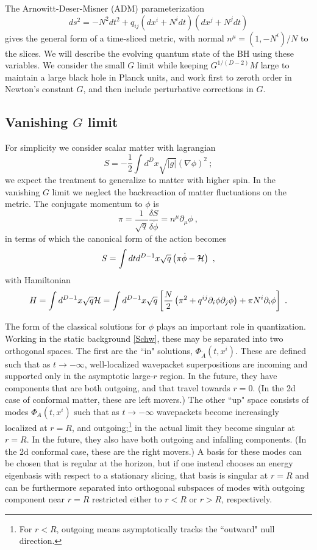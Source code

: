 \documentclass[12pt]{article}
\numberwithin{equation}{section}
\newcommand{\calh}{{\cal H}}
\newcommand{\beq}{\begin{equation}}
\newcommand{\eeq}{\end{equation}}
\newcommand{\hf}{\frac{1}{2}}
\begin{document}
The Arnowitt-Deser-Misner (ADM) parameterization\cite{ADM}
\beq
ds^2= -N^2 dt^2 + q_{ij}(dx^i + N^i dt)(dx^j + N^j dt)
\eeq
gives the general form of a time-sliced metric, with normal $n^\mu=(1,-N^i)/N$ to the slices.  We will describe the evolving quantum state of the BH using these variables.  We consider  the small $G$ limit while keeping $G^{1/(D-2)}M$ large to maintain a large black hole in Planck units,
and work first to zeroth order in Newton's constant $G$, and then include perturbative corrections in $G$.


\subsection{Vanishing $G$ limit}
\label{Gez}

 For simplicity we consider scalar matter with lagrangian
\beq
S=-\hf \int d^D x \sqrt{|g|} (\nabla\phi)^2 \ ;
\eeq
we expect the treatment to generalize to matter with higher spin.  In the vanishing $G$ limit we neglect the backreaction of matter fluctuations on the metric.  The conjugate momentum to $\phi$ is 
\beq
\pi= \frac{1}{\sqrt q}\frac{\delta S}{\delta \dot\phi} =  n^\mu\partial_\mu \phi\ ,
\eeq
in terms of which the canonical form of the action becomes
\beq
S=\int dt d^{D-1}x \sqrt q \left(\pi \dot\phi  - \calh\right)\ ,
\eeq
with Hamiltonian
\beq\label{matH}
H =  \int d^{D-1} x \sqrt q \calh= \int d^{D-1} x \sqrt q \left[ \frac{N}{2}\left(\pi^2+q^{ij}\partial_i\phi \partial_j\phi\right) + \pi N^i \partial_i\phi \right] \ .
\eeq 

The form of the classical solutions for $\phi$ plays an important role in  quantization.  Working in the static background \eqref{Schw}, these may be separated into two orthogonal spaces\cite{GiPe1}.  The first are the ``in" solutions, $\Phi_{\tilde A}(t,x^i)$.  These are defined such that as $t\rightarrow-\infty$, well-localized wavepacket superpositions 
are incoming and supported only in the asymptotic large-$r$ region.  In the future, they have components that are both outgoing, and that travel towards $r=0$.  (In the 2d case of conformal matter, these are left movers.)  The other ``up" space consists of modes $\Phi_A(t,x^i)$ such that as $t\rightarrow-\infty$ wavepackets become increasingly localized at $r=R$, and outgoing;\footnote{For $r<R$, outgoing means asymptotically tracks the ``outward" null direction.} in the actual limit they become singular at $r=R$.  In the future, they also have both outgoing and infalling components.  (In the 2d conformal case, these are the right movers.)  A basis for these modes can be chosen that is regular at the horizon, but if one instead chooses an energy eigenbasis with respect to a stationary slicing, that basis is singular at $r=R$ and can be furthermore separated into orthogonal subspaces of modes with outgoing component near $r=R$ restricted either to $r<R$ or $r>R$, respectively\cite{GiPe1}.
\end{document}
